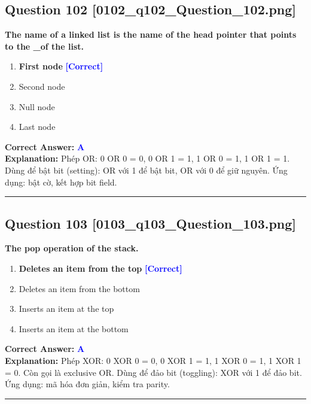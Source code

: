 \documentclass[11pt,a4paper]{article}
\begin{document}
\begin{minipage}{\textwidth}
\subsection*{Question 102 \quad \footnotesize{[0102\_q102\_Question\_102.png]}}
\noindent \textbf{The name of a linked list is the name of the head pointer that points to the \_of the list.}

\begin{enumerate}[label=\Alph*.]
    \item \textbf{First node} \hfill \textcolor{blue}{\textbf{[Correct]}}
    \item Second node
    \item Null node
    \item Last node
\end{enumerate}

\noindent \textbf{Correct Answer:} \textcolor{blue}{\textbf{A}} \\[2pt]
\noindent \textbf{Explanation:} Phép OR: 0 OR 0 = 0, 0 OR 1 = 1, 1 OR 0 = 1, 1 OR 1 = 1. Dùng để bật bit (setting): OR với 1 để bật bit, OR với 0 để giữ nguyên. Ứng dụng: bật cờ, kết hợp bit field.

\par\vspace{0.3cm}
\hrule
\vspace{0.3cm}
\end{minipage}

\begin{minipage}{\textwidth}
\subsection*{Question 103 \quad \footnotesize{[0103\_q103\_Question\_103.png]}}
\noindent \textbf{The pop operation of the stack.}

\begin{enumerate}[label=\Alph*.]
    \item \textbf{Deletes an item from the top} \hfill \textcolor{blue}{\textbf{[Correct]}}
    \item Deletes an item from the bottom
    \item Inserts an item at the top
    \item Inserts an item at the bottom
\end{enumerate}

\noindent \textbf{Correct Answer:} \textcolor{blue}{\textbf{A}} \\[2pt]
\noindent \textbf{Explanation:} Phép XOR: 0 XOR 0 = 0, 0 XOR 1 = 1, 1 XOR 0 = 1, 1 XOR 1 = 0. Còn gọi là exclusive OR. Dùng để đảo bit (toggling): XOR với 1 để đảo bit. Ứng dụng: mã hóa đơn giản, kiểm tra parity.

\par\vspace{0.3cm}
\hrule
\vspace{0.3cm}
\end{minipage}
\end{document}
